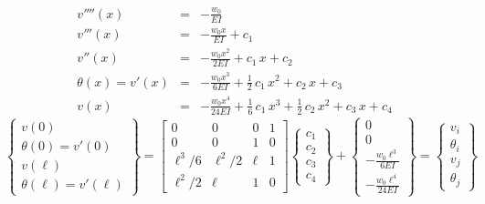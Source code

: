 \documentclass[11pt, oneside]{article}   	%
\begin{document}
\begin{eqnarray}
   v''''(x) &=&  -\frac{w_0}{EI} \\
   v'''(x) &=&  -\frac{w_0 x}{EI} + c_1 \\
   v''(x) &=&   -\frac{w_0 x^2}{2 EI} + c_1\,x + c_2  \\
   \theta(x) = v'(x) &=&  -\frac{w_0 x^3}{6 EI} + \frac{1}{2} \,c_1\,x^2 + c_2\,x + c_3 \\
   v(x) &=&  -\frac{w_0 x^4}{24 EI} + \frac{1}{6} \,c_1\,x^3 + \frac{1}{2} \,c_2\,x^2+ c_3\,x + c_4
   \label{C1}
\end{eqnarray}
\begin{equation}
   \left\{ 
   \begin{array}{c}
   v(0)  \\
   \theta(0) = v'(0)  \\
   v(\ell)  \\
   \theta(\ell) = v'(\ell) 
   \end{array}
   \right\}
   =
   \left[ 
   \begin{array}{cccc}
    0 & 0 & 0 & 1 \\
    0 & 0 & 1 & 0 \\
    \ell^3/6 & \ell^2/2 & \ell & 1 \\
    \ell^2/2 & \ell & 1 & 0
   \end{array}
   \right]
   \left\{ 
   \begin{array}{c}
    c_1 \\
    c_2 \\
    c_3 \\
    c_4 
   \end{array}
   \right\}
   +
   \left\{ 
   \begin{array}{c}
    0 \\
    0 \\
    -\frac{w_0 \ell^3}{6 EI} \\
    -\frac{w_0 \ell^4}{24 EI} 
   \end{array}
   \right\}
   =
   \left\{ 
   \begin{array}{c}
    v_i \\
    \theta_i \\
    v_j \\
    \theta_j 
   \end{array}
   \right\}
   \label{C2}
\end{equation}

\begin{equation}
   \label{C3}
\end{equation}
\end{document}
